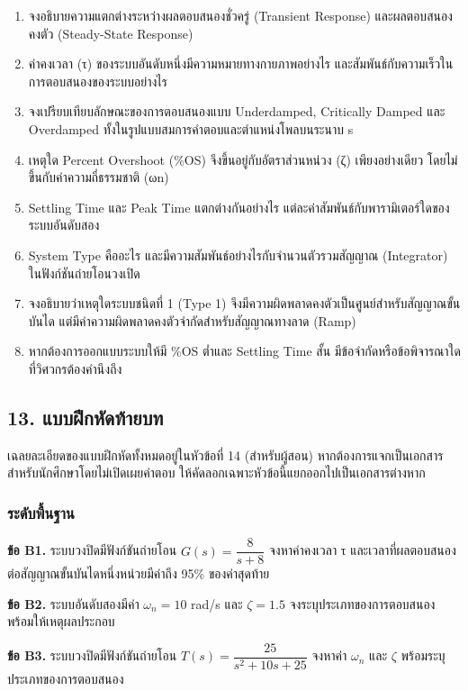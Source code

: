 \begin{enumerate}
    \item จงอธิบายความแตกต่างระหว่างผลตอบสนองชั่วครู่ (Transient Response) และผลตอบสนองคงตัว (Steady-State Response)
    \item ค่าคงเวลา (τ) ของระบบอันดับหนึ่งมีความหมายทางกายภาพอย่างไร และสัมพันธ์กับความเร็วในการตอบสนองของระบบอย่างไร
    \item จงเปรียบเทียบลักษณะของการตอบสนองแบบ Underdamped, Critically Damped และ Overdamped ทั้งในรูปแบบสมการคำตอบและตำแหน่งโพลบนระนาบ s
    \item เหตุใด Percent Overshoot (\%OS) จึงขึ้นอยู่กับอัตราส่วนหน่วง (ζ) เพียงอย่างเดียว โดยไม่ขึ้นกับค่าความถี่ธรรมชาติ (ωn)
    \item Settling Time และ Peak Time แตกต่างกันอย่างไร แต่ละค่าสัมพันธ์กับพารามิเตอร์ใดของระบบอันดับสอง
    \item System Type คืออะไร และมีความสัมพันธ์อย่างไรกับจำนวนตัวรวมสัญญาณ (Integrator) ในฟังก์ชันถ่ายโอนวงเปิด
    \item จงอธิบายว่าเหตุใดระบบชนิดที่ 1 (Type 1) จึงมีความผิดพลาดคงตัวเป็นศูนย์สำหรับสัญญาณขั้นบันได แต่มีค่าความผิดพลาดคงตัวจำกัดสำหรับสัญญาณทางลาด (Ramp)
    \item หากต้องการออกแบบระบบให้มี \%OS ต่ำและ Settling Time สั้น มีข้อจำกัดหรือข้อพิจารณาใดที่วิศวกรต้องคำนึงถึง
\end{enumerate}

\newpage

\subsection{13. แบบฝึกหัดท้ายบท}

เฉลยละเอียดของแบบฝึกหัดทั้งหมดอยู่ในหัวข้อที่ 14 (สำหรับผู้สอน) หากต้องการแจกเป็นเอกสารสำหรับนักศึกษาโดยไม่เปิดเผยคำตอบ ให้คัดลอกเฉพาะหัวข้อนี้แยกออกไปเป็นเอกสารต่างหาก

\subsubsection{ระดับพื้นฐาน}

\textbf{ข้อ B1.} ระบบวงปิดมีฟังก์ชันถ่ายโอน $G(s)=\dfrac{8}{s+8}$ จงหาค่าคงเวลา τ และเวลาที่ผลตอบสนองต่อสัญญาณขั้นบันไดหนึ่งหน่วยมีค่าถึง 95\% ของค่าสุดท้าย

\textbf{ข้อ B2.} ระบบอันดับสองมีค่า $\omega_n=10$ rad/s และ $\zeta=1.5$ จงระบุประเภทของการตอบสนอง พร้อมให้เหตุผลประกอบ

\textbf{ข้อ B3.} ระบบวงปิดมีฟังก์ชันถ่ายโอน $T(s)=\dfrac{25}{s^2+10s+25}$ จงหาค่า $\omega_n$ และ $\zeta$ พร้อมระบุประเภทของการตอบสนอง


